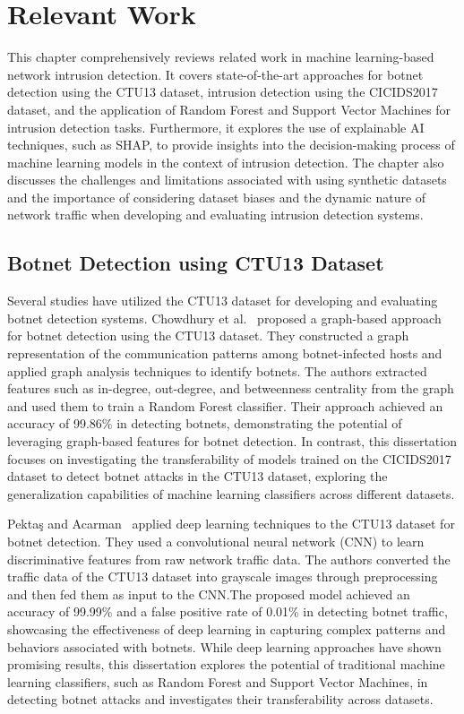 \chapter{Relevant Work}

This chapter comprehensively reviews related work in machine learning-based network intrusion detection. It covers state-of-the-art approaches for botnet detection using the CTU13 dataset, intrusion detection using the CICIDS2017 dataset, and the application of Random Forest and Support Vector Machines for intrusion detection tasks. Furthermore, it explores the use of explainable AI techniques, such as SHAP, to provide insights into the decision-making process of machine learning models in the context of intrusion detection. The chapter also discusses the challenges and limitations associated with using synthetic datasets and the importance of considering dataset biases and the dynamic nature of network traffic when developing and evaluating intrusion detection systems.

\section{Botnet Detection using CTU13 Dataset}

Several studies have utilized the CTU13 dataset for developing and evaluating botnet detection systems. Chowdhury et al.~\cite{chowdhury2017botnet} proposed a graph-based approach for botnet detection using the CTU13 dataset. They constructed a graph representation of the communication patterns among botnet-infected hosts and applied graph analysis techniques to identify botnets. The authors extracted features such as in-degree, out-degree, and betweenness centrality from the graph and used them to train a Random Forest classifier. Their approach achieved an accuracy of 99.86\% in detecting botnets, demonstrating the potential of leveraging graph-based features for botnet detection. In contrast, this dissertation focuses on investigating the transferability of models trained on the CICIDS2017 dataset to detect botnet attacks in the CTU13 dataset, exploring the generalization capabilities of machine learning classifiers across different datasets.

Pektaş and Acarman~\cite{pektacs2019deep} applied deep learning techniques to the CTU13 dataset for botnet detection. They used a convolutional neural network (CNN) to learn discriminative features from raw network traffic data. The authors converted the traffic data of the CTU13 dataset into grayscale images through preprocessing and then fed them as input to the CNN.\@ The proposed model achieved an accuracy of 99.99\% and a false positive rate of 0.01\% in detecting botnet traffic, showcasing the effectiveness of deep learning in capturing complex patterns and behaviors associated with botnets. While deep learning approaches have shown promising results, this dissertation explores the potential of traditional machine learning classifiers, such as Random Forest and Support Vector Machines, in detecting botnet attacks and investigates their transferability across datasets.

